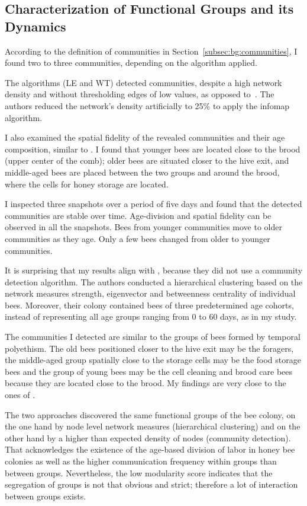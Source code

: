 \subsection{Characterization of Functional Groups and its Dynamics}
According to the definition of communities in Section~\ref{subsec:bg:communities}, I found two to three communities, depending on the algorithm applied.

The algorithms (LE and WT) detected communities, despite a high network density and without thresholding edges of low values, as opposed to~\textcite{mersch2013tracking}.
The authors reduced the network's density artificially to 25\% to apply the infomap algorithm.

I also examined the spatial fidelity of the revealed communities and their age composition, similar to \textcite{baracchi2014socio}.
I found that younger bees are located close to the brood (upper center of the comb); older bees are situated closer to the hive exit, and middle-aged bees are placed between the two groups and around the brood, where the cells for honey storage are located.

I inspected three snapshots over a period of five days and found that the detected communities are stable over time.
Age-division and spatial fidelity can be observed in all the snapshots.
Bees from younger communities move to older communities as they age. Only a few bees changed from older to younger communities.

It is surprising that my results align with \textcite{baracchi2014socio}, because they did not use a community detection algorithm.
The authors conducted a hierarchical clustering based on the network measures strength, eigenvector and betweenness centrality of individual bees.
Moreover, their colony contained bees of three predetermined age cohorts, instead of representing all age groups ranging from 0 to 60 days, as in my study.

The communities I detected are similar to the groups of bees formed by temporal polyethism.
The old bees positioned closer to the hive exit may be the foragers, the middle-aged group spatially close to the storage cells may be the food storage bees and the group of young bees  may be the cell cleaning and brood care bees because they are located close to the brood. My findings are very close to the ones of \textcite{baracchi2014socio}.

The two approaches discovered the same functional groups of the bee colony, on the one hand by node level network measures (hierarchical clustering) and on the other hand by a higher than expected density of nodes (community detection).
That acknowledges the existence of the age-based division of labor in honey bee colonies as well as the higher communication frequency within groups than between groups.
Nevertheless, the low modularity score indicates that the segregation of groups is not that obvious and strict; therefore a lot of interaction between groups exists.

